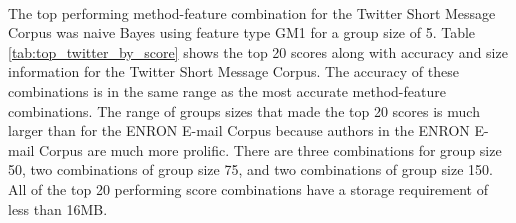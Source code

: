 \paragraph*{}  The top performing method-feature combination for the Twitter Short Message Corpus was naive Bayes using feature type GM1 for a group size of 5.  Table \ref{tab:top_twitter_by_score} shows the top 20 scores along with accuracy and size information for the Twitter Short Message Corpus.  The accuracy of these combinations is in the same range as the most accurate method-feature combinations. The range of groups sizes that made the top 20 scores is much larger than for the ENRON E-mail Corpus because authors in the ENRON E-mail Corpus are much more prolific.  There are three combinations for group size 50, two combinations of group size 75, and two combinations of group size 150. All of the top 20 performing score combinations have a storage requirement of less than 16MB.

